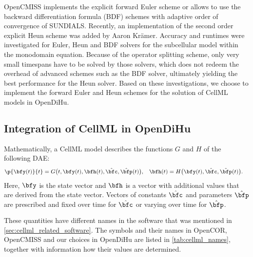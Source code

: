 OpenCMISS implements the explicit forward Euler scheme or allows to use the backward differentiation formula (BDF) schemes with adaptive order of convergence of SUNDIALS. Recently, an implementation of the second order explicit Heun scheme was added by Aaron Krämer. Accuracy and runtimes were investigated for Euler, Heun and BDF solvers for the subcellular model within the monodomain equation. Because of the operator splitting scheme, only very small timespans have to be solved by those solvers, which does not redeem the overhead of advanced schemes such as the BDF solver, ultimately yielding the best performance for the Heun solver. Based on these investigations, we choose to implement the forward Euler and Heun schemes for the solution of CellML models in OpenDiHu.

\subsection{Integration of CellML in OpenDiHu}

Mathematically, a CellML model describes the functions $G$ and $H$ of the following DAE:
\begin{align*}
  \p{\bfy(t)}{t} &= G\big(t,\bfy(t),\bfh(t),\hat{\bfc},\hat{\bfp}(t)\big), & \bfh(t) &= H\big(\bfy(t),\hat{\bfc},\hat{\bfp}(t)\big).
\end{align*}
Here, $\bfy$ is the state vector and $\bfh$ is a vector with additional values that are derived from the state vector. Vectors of constants $\hat{\bfc}$ and parameters $\hat{\bfp}$ are prescribed and fixed over time for $\hat{\bfc}$ or varying over time for $\hat{\bfp}$.

These quantities have different names in the software that was mentioned in \cref{sec:cellml_related_software}. The symbols and their names in OpenCOR, OpenCMISS and our choices in OpenDiHu are listed in \cref{tab:cellml_names}, together with information how their values are determined. 

